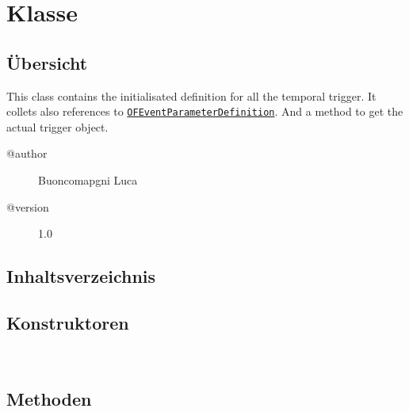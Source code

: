
\section[OFTimeTriggerDefinition]{Klasse }\label{ontologyFramework.OFEventManagement.OFTimeTriggerManagement.OFTimeTriggerDefinition-class}
\subsection{Übersicht}
This class contains the initialisated definition for all the temporal trigger. 
 It collets also references to \texttt{\hyperlink{ontologyFramework.OFEventManagement.OFEventParameterDefinition-class}{OFEventParameterDefinition}}.
 And a method to get the actual trigger object.
\begin{description}
\item[@author] 
Buoncomapgni Luca
\item[@version] 
1.0
\end{description}
\subsection{Inhaltsverzeichnis}
\subsection{Konstruktoren}
\begin{description}
\item[{\label{ontologyFramework.OFEventManagement.OFTimeTriggerManagement.OFTimeTriggerDefinition(java.lang.String)}}]
~ 
\end{description}
\subsection{Methoden}
\begin{description}
\item[{\label{ontologyFramework.OFEventManagement.OFTimeTriggerManagement.OFTimeTriggerDefinition.compute(ontologyFramework.OFRunning.OFInvokingManager.OFBuildedListInvoker)}}]
~ 
\end{description}
